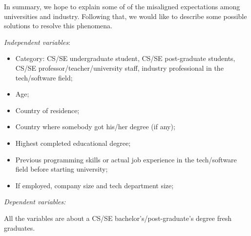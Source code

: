 \documentclass{sigchi}
\begin{document}
In summary, we hope to explain some of of the misaligned expectations among universities and industry. Following that, we would like to describe some possible solutions to resolve this phenomena. \newline


\textit{Independent variables}:
\begin{itemize}
	\item Category: CS/SE undergraduate student, CS/SE post-graduate students, CS/SE professor/teacher/university staff, industry professional in the tech/software field;
	\item Age;
	\item Country of residence;
	\item Country where somebody got his/her degree (if any);
	\item Highest completed educational degree;
	\item Previous programming skills or actual job experience in the tech/software field before starting university;
	\item If employed, company size and tech department size;
\end{itemize}

\textit{Dependent variables:}

All the variables are about a CS/SE bachelor's/post-graduate's degree fresh graduates.
\end{document}
